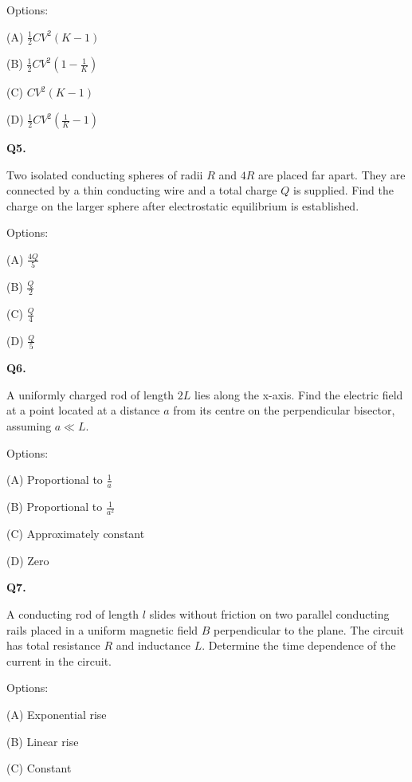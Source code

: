 \documentclass[12pt]{article}
\begin{document}
Options:

(A) $\frac{1}{2}CV^2(K-1)$

(B) $\frac{1}{2}CV^2\left(1-\frac{1}{K}\right)$

(C) $CV^2(K-1)$

(D) $\frac{1}{2}CV^2\left(\frac{1}{K}-1\right)$

\vspace{0.7cm}

\textbf{Q5.}

Two isolated conducting spheres of radii $R$ and $4R$ are placed far apart. 
They are connected by a thin conducting wire and a total charge $Q$ is supplied. 
Find the charge on the larger sphere after electrostatic equilibrium is established.

Options:

(A) $\frac{4Q}{5}$

(B) $\frac{Q}{2}$

(C) $\frac{Q}{4}$

(D) $\frac{Q}{5}$

\vspace{0.7cm}

\textbf{Q6.}

A uniformly charged rod of length $2L$ lies along the x-axis. 
Find the electric field at a point located at a distance $a$ from its centre 
on the perpendicular bisector, assuming $a \ll L$.

Options:

(A) Proportional to $\frac{1}{a}$

(B) Proportional to $\frac{1}{a^2}$

(C) Approximately constant

(D) Zero

\vspace{0.7cm}

\textbf{Q7.}

A conducting rod of length $l$ slides without friction on two parallel conducting rails 
placed in a uniform magnetic field $B$ perpendicular to the plane. 
The circuit has total resistance $R$ and inductance $L$. 
Determine the time dependence of the current in the circuit.

Options:

(A) Exponential rise

(B) Linear rise

(C) Constant
\end{document}
